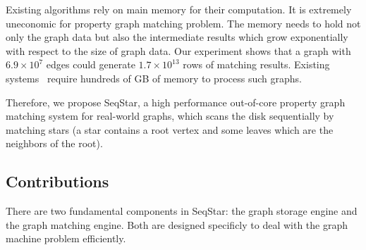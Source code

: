 
Existing algorithms rely on main memory for their computation. It is extremely uneconomic for property graph matching problem. The memory needs to hold not only the graph data but also the intermediate results which grow exponentially with respect to the size of graph data. Our experiment shows that a graph with $6.9 \times 10^{7}$ edges could generate $1.7 \times 10^{13}$ rows of matching results.
Existing systems~\cite{DBLP:conf/sosp/TeixeiraFSSZA15,DBLP:conf/sigmod/DiasTGM019,DBLP:journals/pvldb/MhedhbiS19} require hundreds of GB of memory to process such graphs.

Therefore, we propose SeqStar, a high performance out-of-core property graph matching system for real-world graphs, which scans the disk sequentially by matching stars (a star contains a root vertex and some leaves which are the neighbors of the root).


\subsection*{Contributions}
There are two fundamental components in SeqStar:
the graph storage engine and the graph matching engine. Both are designed specificly to deal with the graph machine problem efficiently.

